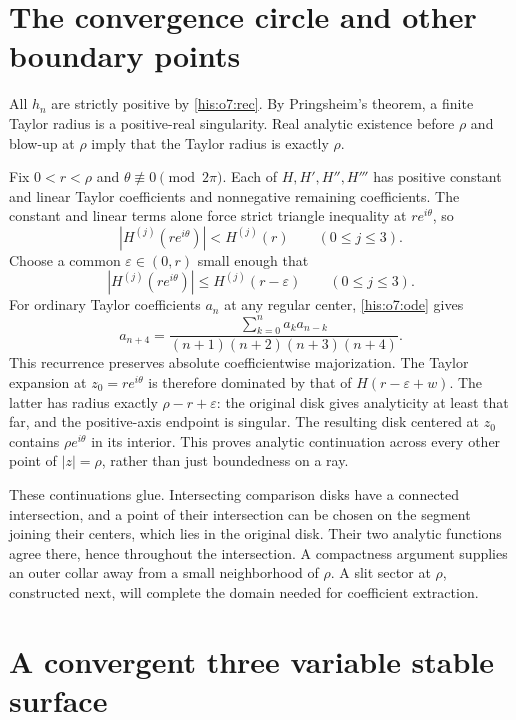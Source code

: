 \documentclass[11pt]{article}
\theoremstyle{remark}\newtheorem{remark}[theorem]{Remark}
\newcommand{\eps}{\varepsilon}
\numberwithin{equation}{section}
\begin{document}
\section{The convergence circle and other boundary points}\label{his:o7:circle}
All $h_n$ are strictly positive by \eqref{his:o7:rec}. By Pringsheim's theorem,
a finite Taylor radius is a positive-real singularity. Real analytic
existence before $\rho$ and blow-up at $\rho$ imply that the Taylor
radius is exactly $\rho$.

Fix $0<r<\rho$ and $\theta\not\equiv0\pmod{2\pi}$. Each of
$H,H',H'',H'''$ has positive constant and linear Taylor coefficients
and nonnegative remaining coefficients. The constant and linear terms
alone force strict triangle inequality at $re^{i\theta}$, so
\[
|H^{(j)}(re^{i\theta})|<H^{(j)}(r)\qquad(0\le j\le3).
\]
Choose a common $\eps\in(0,r)$ small enough that
\begin{equation}\label{his:o7:strict}
|H^{(j)}(re^{i\theta})|\le H^{(j)}(r-\eps)
\qquad(0\le j\le3).
\end{equation}
For ordinary Taylor coefficients $a_n$ at any regular center,
\eqref{his:o7:ode} gives
\begin{equation}\label{his:o7:center-rec}
a_{n+4}=\frac{\sum_{k=0}^n a_k a_{n-k}}
{(n+1)(n+2)(n+3)(n+4)}.
\end{equation}
This recurrence preserves absolute coefficientwise majorization.
The Taylor expansion at $z_0=re^{i\theta}$ is therefore dominated
by that of $H(r-\eps+w)$. The latter has radius exactly
$\rho-r+\eps$: the original disk gives analyticity at least that
far, and the positive-axis endpoint is singular.
The resulting disk centered at $z_0$ contains $\rho e^{i\theta}$
in its interior. This proves analytic continuation across every
other point of $|z|=\rho$, rather than just boundedness on a ray.

These continuations glue. Intersecting comparison disks have a
connected intersection, and a point of their intersection can be
chosen on the segment joining their centers, which lies in the
original disk. Their two analytic functions agree there, hence
throughout the intersection. A compactness argument supplies an
outer collar away from a small neighborhood of $\rho$. A slit
sector at $\rho$, constructed next, will complete the domain
needed for coefficient extraction.

\section{A convergent three variable stable surface}\label{his:o7:stable}
\end{document}
